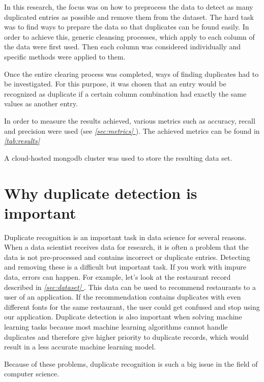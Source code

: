 \documentclass[conference]{IEEEtran}
\newcommand*{\fullref}[1]{\textit{\hyperref[{#1}]{\autoref*{#1} \nameref*{#1}}}}
\begin{document}
In this research, the focus was on how to preprocess the data to detect as many duplicated entries as possible and remove them from the dataset. The hard task was to find ways to prepare the data so that duplicates can be found easily. In order to achieve this, generic cleansing processes, which apply to each column of the data were first used. Then each column was considered individually and specific methods were applied to them.

Once the entire clearing process was completed, ways of finding duplicates had to be investigated. For this purpose, it was chosen that an entry would be recognized as duplicate if a certain column combination had exactly the same values as another entry.

In order to measure the results achieved, various metrics such as accuracy, recall and precision were used (see \fullref{sec:metrics}). The achieved metrics can be found in \fullref{tab:results}

A cloud-hosted mongodb cluster was used to store the resulting data set.
\section{Why duplicate detection is important}
Duplicate recognition is an important task in data science for several reasons. When a data scientist receives data for research, it is often a problem that the data is not pre-processed and contains incorrect or duplicate entries. Detecting and removing these is a difficult but important task. If you work with impure data, errors can happen. For example, let's look at the restaurant record described in \fullref{sec:dataset}. This data can be used to recommend restaurants to a user of an application. If the recommendation contains duplicates with even different fonts for the same restaurant, the user could get confused and stop using our application. Duplicate detection is also important when solving machine learning tasks because most machine learning algorithms cannot handle duplicates and therefore give higher priority to duplicate records, which would result in a less accurate machine learning model.

Because of these problems, duplicate recognition is such a big issue in the field of computer science.
\end{document}
